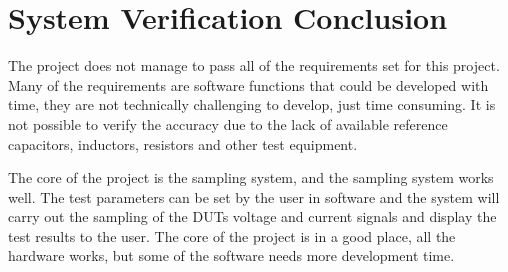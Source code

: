 \section{System Verification Conclusion} \label{subsec:8_3_SystemVerifyConclude}
The project does not manage to pass all of the requirements set for this project. Many of the requirements are software functions that could be developed with time, they are not technically challenging to develop, just time consuming. It is not possible to verify the accuracy due to the lack of available reference capacitors, inductors, resistors and other test equipment. 

The core of the project is the sampling system, and the sampling system works well. The test parameters can be set by the user in software and the system will carry out the sampling of the DUTs voltage and current signals and display the test results to the user. The core of the project is in a good place, all the hardware works, but some of the software needs more development time.


